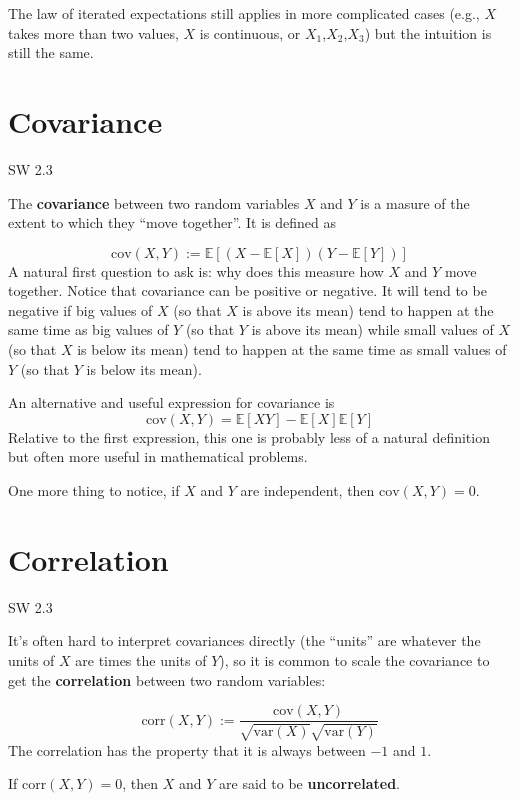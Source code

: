 \documentclass[
  letterpaper,
  DIV=11,
  numbers=noendperiod]{scrreprt}
\begin{document}
The law of iterated expectations still applies in more complicated cases
(e.g., \(X\) takes more than two values, \(X\) is continuous, or
\(X_1\),\(X_2\),\(X_3\)) but the intuition is still the same.

\section{Covariance}\label{covariance}

SW 2.3

The \textbf{covariance} between two random variables \(X\) and \(Y\) is
a masure of the extent to which they ``move together''. It is defined as

\[
  \mathrm{cov}(X,Y) := \mathbb{E}[(X-\mathbb{E}[X])(Y-\mathbb{E}[Y])]
\] A natural first question to ask is: why does this measure how \(X\)
and \(Y\) move together. Notice that covariance can be positive or
negative. It will tend to be negative if big values of \(X\) (so that
\(X\) is above its mean) tend to happen at the same time as big values
of \(Y\) (so that \(Y\) is above its mean) while small values of \(X\)
(so that \(X\) is below its mean) tend to happen at the same time as
small values of \(Y\) (so that \(Y\) is below its mean).

An alternative and useful expression for covariance is \[
  \mathrm{cov}(X,Y) = \mathbb{E}[XY] - \mathbb{E}[X]\mathbb{E}[Y]
\] Relative to the first expression, this one is probably less of a
natural definition but often more useful in mathematical problems.

One more thing to notice, if \(X\) and \(Y\) are independent, then
\(\mathrm{cov}(X,Y) = 0\).

\section{Correlation}\label{correlation}

SW 2.3

It's often hard to interpret covariances directly (the ``units'' are
whatever the units of \(X\) are times the units of \(Y\)), so it is
common to scale the covariance to get the \textbf{correlation} between
two random variables:

\[
  \mathrm{corr}(X,Y) := \frac{\mathrm{cov}(X,Y)}{\sqrt{\mathrm{var}(X)} \sqrt{\mathrm{var}(Y)}}
\] The correlation has the property that it is always between \(-1\) and
\(1\).

If \(\mathrm{corr}(X,Y) = 0\), then \(X\) and \(Y\) are said to be
\textbf{uncorrelated}.
\end{document}
